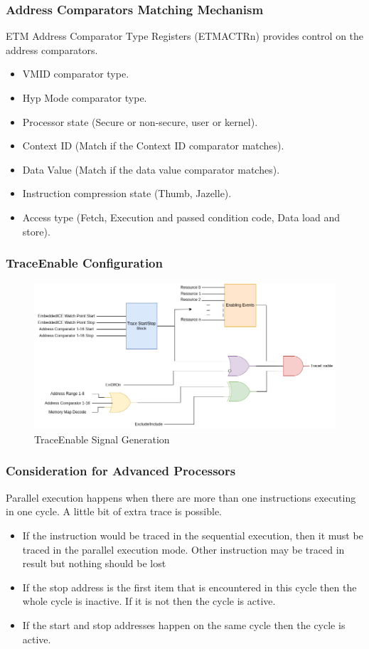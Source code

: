 \documentclass{beamer}
\begin{document}
\begin{frame}
    \frametitle{Address Comparators Matching Mechanism}
    ETM Address Comparator Type Registers (ETMACTRn) provides control on the
    address comparators.
    \begin{itemize}
        \item VMID comparator type.
        \item Hyp Mode comparator type.
        \item Processor state (Secure or non-secure, user or kernel).
        \item Context ID (Match if the Context ID comparator matches).
        \item Data Value (Match if the data value comparator matches).
        \item Instruction compression state (Thumb, Jazelle).
        \item Access type (Fetch, Execution and passed condition code,
            Data load and store).
    \end{itemize}
\end{frame}

\begin{frame}
    \frametitle{TraceEnable Configuration}
    \begin{figure}
        \centering
        \includegraphics[width=1.00\columnwidth]{etm.drawio.png}
        \caption{TraceEnable Signal Generation}
        \label{fig:TraceEnable}
    \end{figure}
\end{frame}

\begin{frame}
    \frametitle{Consideration for Advanced Processors}
    Parallel execution happens when there are more than one instructions
    executing in one cycle. A little bit of extra trace is possible.
    \begin{itemize}
        \item If the instruction would be traced in the sequential execution,
            then it must be traced in the parallel execution mode.
            Other instruction may be traced in result but nothing should be lost
        \item If the stop address is the first item that is encountered in this
            cycle then the whole cycle is inactive. If it is not then
            the cycle is active.
        \item If the start and stop addresses happen on the same cycle then the
            cycle is active.
    \end{itemize}
\end{frame}
\end{document}

